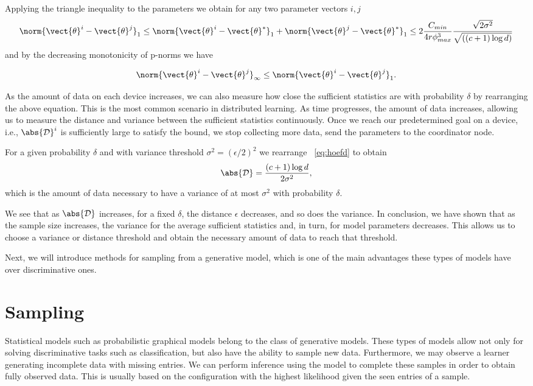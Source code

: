 Applying the triangle inequality to the parameters we obtain for any two parameter vectors $i,j$
\begin{equation}
    \norm{\vect{\theta}^i- \vect{\theta}^j}_1 \leq  \norm{\vect{\theta}^i - \vect{\theta}^*}_1  +  \norm{\vect{\theta}^j- \vect{\theta}^*}_1 \leq 2 \frac{C_{min}}{4r\phi^3_{max}} \frac{\sqrt{2\sigma^2}}{\sqrt{((c+1) \log d)}}
\end{equation}
and by the decreasing monotonicity of p-norms \cite{raissouli2010various} we have

\begin{equation}
    \norm{\vect{\theta}^i- \vect{\theta}^j}_{\infty}  \leq \norm{\vect{\theta}^i- \vect{\theta}^j}_1.
\end{equation}

As the amount of data on each device increases, we can also measure how close the sufficient statistics are with probability $\delta$ by rearranging the above equation. 
This is the most common scenario in distributed learning. 
As time progresses, the amount of data increases, allowing us to measure the distance and variance between the sufficient statistics continuously.
Once we reach our predetermined goal on a device, i.e., $\abs{\mathcal{D}}^i$ is sufficiently large to satisfy the bound, we stop collecting more data, send the parameters to the coordinator node.

For a given probability $\delta$ and with variance threshold $\sigma^2 = (\epsilon/2)^2$ we rearrange \eq~\ref{eq:hoefd} to obtain 
\begin{equation}
    \abs{\mathcal{D}} = \frac{(c+1) \log d}{2 \sigma^2},
\end{equation} 
which is the amount of data necessary to have a variance of at most $\sigma^2$ with probability $\delta$.

We see that as $\abs{\mathcal{D}}$ increases, for a fixed $\delta$, the distance $\epsilon$ decreases, and so does the variance. 
In conclusion, we have shown that as the sample size increases, the variance for the average sufficient statistics and, in turn, for model parameters decreases.
This allows us to choose a variance or distance threshold and obtain the necessary amount of data to reach that threshold.

Next, we will introduce methods for sampling from a generative model, which is one of the main advantages these types of models have over discriminative ones.

\section{Sampling}
\label{sec:sampling}
Statistical models such as probabilistic graphical models belong to the class of generative models.
These types of models allow not only for solving discriminative tasks such as classification, but also have the ability to sample new data.
Furthermore, we may observe a learner generating incomplete data with missing entries.
We can perform inference using the model to complete these samples in order to obtain fully observed data.
This is usually based on the configuration with the highest likelihood given the seen entries of a sample.

